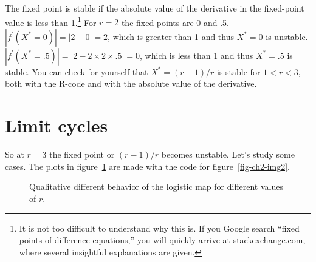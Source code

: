 \documentclass[
  a4paper,
  DIV=11,
  numbers=noendperiod,
  oneside]{scrreprt}
\begin{document}
The fixed point is stable if the absolute value of the derivative in the
fixed-point value is less than 1.\footnote{It is not too difficult to
  understand why this is. If you Google search ``fixed points of
  difference equations,'' you will quickly arrive at stackexchange.com,
  where several insightful explanations are given.} For \(r = 2\) the
fixed points are 0 and .5.
\(\left| f^{'}\left( X^{*} = 0 \right) \right| = |2 - 0| = 2\), which is
greater than 1 and thus \(X^{*} = 0\) is unstable.
\(\left| f^{'}\left( X^{*} = .5 \right) \right| = |2 - 2 \times 2 \times .5| = 0\),
which is less than 1 and thus \(X^{*} = .5\) is stable. You can check
for yourself that \(X^{*}=(r - 1)/r\) is stable for \(1 < r < 3\), both
with the R-code and with the absolute value of the derivative.

\section{Limit cycles}\label{sec-Limit-cycles}

So at \(r = 3\) the fixed point or \((r - 1)/r\) becomes unstable. Let's
study some cases. The plots in figure~\ref{fig-ch2-img4} are made with
the code for figure~\ref{fig-ch2-img2}.

\begin{figure}


\caption{\label{fig-ch2-img4}Qualitative different behavior of the
logistic map for different values of \(r\).}

\end{figure}%
\end{document}
